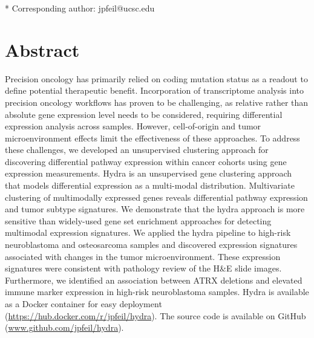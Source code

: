 \documentclass[10pt,letterpaper]{article}
\begin{document}
\begin{flushleft}
% 
%





* Corresponding author: jpfeil@ucsc.edu

\end{flushleft}
\section*{Abstract}
Precision oncology has primarily relied on coding mutation status as a readout to define potential therapeutic benefit. Incorporation of transcriptome analysis into precision oncology workflows has proven to be challenging, as relative rather than absolute gene expression level needs to be considered, requiring differential expression analysis across samples. However, cell-of-origin and tumor microenvironment effects limit the effectiveness of these approaches. To address these challenges, we developed an unsupervised clustering approach for discovering differential pathway expression within cancer cohorts using gene expression measurements. Hydra is an unsupervised gene clustering approach that models differential expression as a multi-modal distribution. Multivariate clustering of multimodally expressed genes reveals differential pathway expression and tumor subtype signatures. We demonstrate that the hydra approach is more sensitive than widely-used gene set enrichment approaches for detecting multimodal expression signatures. We applied the hydra pipeline to high-risk neuroblastoma and osteosarcoma samples and discovered expression signatures associated with changes in the tumor microenvironment. These expression signatures were consistent with pathology review of the H\&E slide images. Furthermore, we identified an association between ATRX deletions and elevated immune marker expression in high-risk neuroblastoma samples. Hydra is available as a Docker container for easy deployment (\url{https://hub.docker.com/r/jpfeil/hydra}). The source code is available on GitHub (\url{www.github.com/jpfeil/hydra}).
\end{document}
